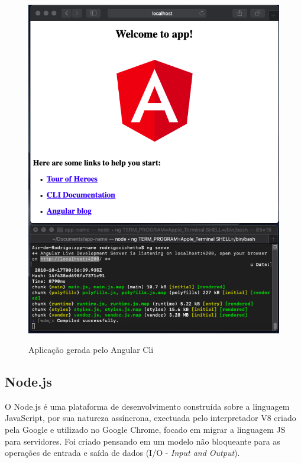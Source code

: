 \documentclass[
	12pt,				%
	openright,			%
	twoside,			%
	a4paper,			%
	english,			%
	brazil				%
	]{abntex2}
\begin{document}
\pagebreak
\begin{figure}[h]
	\centering

	\caption{Aplicação gerada pelo Angular Cli} \label{fig:AngularCliApp}
    \includegraphics[scale=0.4]{angular-cli-app} \\

\end{figure}

\subsection{Node.js}

O Node.js é uma plataforma de desenvolvimento construída sobre a linguagem JavaScript, por sua natureza assíncrona, exectuada pelo interpretador V8 criado pela Google e utilizado no Google Chrome, focado em migrar a linguagem JS para servidores. Foi criado pensando em um modelo não bloqueante para as operações de entrada e saída de dados (I/O - \textit{Input and Output}).
\end{document}

